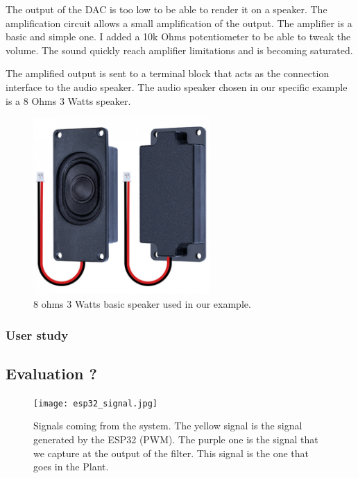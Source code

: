 The output of the DAC is too low to be able to render it on a speaker. The amplification circuit allows a small
amplification of the output. The amplifier is a basic and simple one. I added a 10k Ohms potentiometer to be able to
tweak the volume. The sound quickly reach amplifier limitations and is becoming saturated.

The amplified output is sent to a terminal block that acts as the connection interface to the audio speaker.
The audio speaker chosen in our specific example is a 8 Ohms 3 Watts speaker.

\begin{figure}[h!]
    \centering
    \includegraphics[width=0.6\textwidth]{images/speaker.jpg}
    \caption{8 ohms 3 Watts basic speaker used in our example.}
    \vspace{0.1cm}
    \label{fig:speaker}
\end{figure}


\newpage
\subsubsection{User study}

\subsection{Evaluation ?}

\begin{figure}[h!]
    \centering
    \texttt{[image: esp32\_signal.jpg]}
    \caption{Signals coming from the system. The yellow signal is the signal generated by the ESP32 (PWM). The purple one is the signal that we capture at the output of the filter. This signal is the one that goes in the Plant.}
    \vspace{0.1cm}
    \label{fig:esp_32_signal}
\end{figure}



